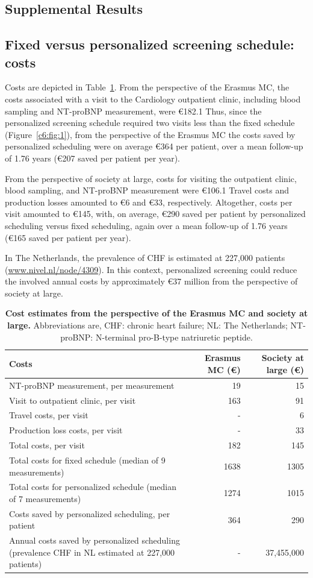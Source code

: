 \begin{subappendices}
\section{Supplemental Results}
\subsection{Fixed versus personalized screening schedule: costs}
Costs are depicted in Table~\ref{c6:table:app1}. From the perspective of the Erasmus MC, the costs associated with a visit to the Cardiology outpatient clinic, including blood sampling and NT-proBNP measurement, were €182.1 Thus, since the personalized screening schedule required two visits less than the fixed schedule (Figure~\ref{c6:fig:1}), from the perspective of the Erasmus MC the costs saved by personalized scheduling were on average €364 per patient, over a mean follow-up of 1.76 years (€207 saved per patient per year).

From the perspective of society at large, costs for visiting the outpatient clinic, blood sampling, and NT-proBNP measurement were €106.1 Travel costs and production losses amounted to €6 and €33, respectively. Altogether, costs per visit amounted to €145, with, on average, €290 saved per patient by personalized scheduling versus fixed scheduling, again over a mean follow-up of 1.76 years (€165 saved per patient per year).

In The Netherlands, the prevalence of CHF is estimated at 227,000 patients (\url{www.nivel.nl/node/4309}). In this context, personalized screening could reduce the involved annual costs by approximately €37 million from the perspective of society at large.

\begin{table}
\small
\centering
\caption{\textbf{Cost estimates from the perspective of the Erasmus MC and society at large.} Abbreviations are, CHF: chronic heart failure; NL: The Netherlands; NT-proBNP: N-terminal pro-B-type natriuretic peptide.}
\label{c6:table:app1}
\begin{tabular}{p{6cm}rr}
\toprule
\textbf{Costs} & Erasmus MC (€) & Society at large (€)\\
\midrule
NT-proBNP measurement, per measurement & 19 & 15\\
Visit to outpatient clinic, per visit & 163 & 91\\
Travel costs, per visit	& - & 6\\
Production loss costs, per visit & - & 33\\
Total costs, per visit & 182 & 145\\
\midrule	
Total costs for fixed schedule (median of 9 measurements) & 1638 & 1305\\
Total costs for personalized schedule (median of 7 measurements) & 1274 & 1015\\
Costs saved by personalized scheduling, per patient & 364 & 290\\
Annual costs saved by personalized scheduling (prevalence CHF in NL estimated at 227,000 patients) & - & 37,455,000\\
\bottomrule
\end{tabular}
\end{table}


\end{subappendices}
